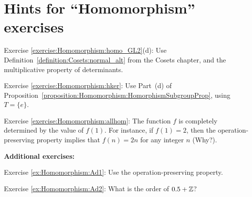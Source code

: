 \section{Hints for ``Homomorphism'' exercises}
\label{sec:Homomorphism:Hints} 


\noindent Exercise \ref{exercise:Homomorphism:homo_GL2}(d): 
Use Definition~\ref{definition:Cosets:normal_alt} from the Cosets chapter, and the multiplicative property of determinants.

\noindent Exercise \ref{exercise:Homomorphism:hker}:   Use Part~(d) of Proposition~\ref{proposition:Homomorphism:HomorphismSubgroupProp}, using  $T=\{e\}$.

\noindent Exercise \ref{exercise:Homomorphism:allhom}: 
The function $f$ is completely determined by the value of $f(1)$.  For instance, if $f(1)=2$, then the operation-preserving property implies that $f(n)=2n$ for any integer $n$ (Why?).
\bigskip

\textbf{Additional exercises:}

\noindent Exercise \ref{ex:Homomorphism:Ad1}:  Use the operation-preserving property.

\noindent Exercise \ref{ex:Homomorphism:Ad2}: What is the order of $0.5 + \mathbb{Z}$?

